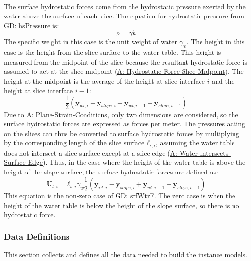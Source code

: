 \documentclass[12pt]{article}
\begin{document}
\paragraph{}
\label{GD:srfWtrFDeriv}
The surface hydrostatic forces come from the hydrostatic pressure exerted by the water above the surface of each slice. The equation for hydrostatic pressure from \hyperref[GD:hsPressure]{GD: hsPressure} is:
\begin{displaymath}
p=γ h
\end{displaymath}
The specific weight in this case is the unit weight of water ${γ_{w}}$. The height in this case is the height from the slice surface to the water table. This height is measured from the midpoint of the slice because the resultant hydrostatic force is assumed to act at the slice midpoint (\hyperref[assumpHFSM]{A: Hydrostatic-Force-Slice-Midpoint}). The height at the midpoint is the average of the height at slice interface $i$ and the height at slice interface $i-1$:
\begin{displaymath}
\frac{1}{2} \left({\mathbf{y}_{wt,i}}-{\mathbf{y}_{slope,i}}+{\mathbf{y}_{wt,i-1}}-{\mathbf{y}_{slope,i-1}}\right)
\end{displaymath}
Due to \hyperref[assumpPSC]{A: Plane-Strain-Conditions}, only two dimensions are considered, so the surface hydrostatic forces are expressed as forces per meter. The pressures acting on the slices can thus be converted to surface hydrostatic forces by multiplying by the corresponding length of the slice surface ${\mathbf{ℓ}_{s,i}}$, assuming the water table does not intersect a slice surface except at a slice edge (\hyperref[assumpWISE]{A: Water-Intersects-Surface-Edge}). Thus, in the case where the height of the water table is above the height of the slope surface, the surface hydrostatic forces are defined as:
\begin{displaymath}
{\mathbf{U}_{t,i}}={\mathbf{ℓ}_{s,i}} {γ_{w}} \frac{1}{2} \left({\mathbf{y}_{wt,i}}-{\mathbf{y}_{slope,i}}+{\mathbf{y}_{wt,i-1}}-{\mathbf{y}_{slope,i-1}}\right)
\end{displaymath}
This equation is the non-zero case of \hyperref[GD:srfWtrF]{GD: srfWtrF}. The zero case is when the height of the water table is below the height of the slope surface, so there is no hydrostatic force.
\subsubsection{Data Definitions}
\label{Sec:DDs}
This section collects and defines all the data needed to build the instance models.
\par~
\end{document}
